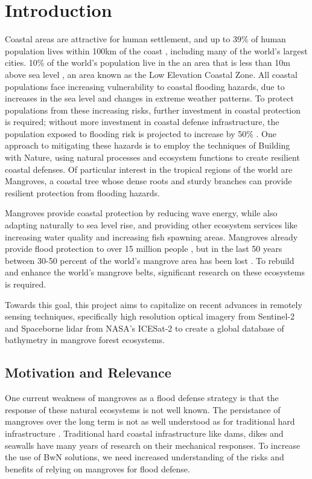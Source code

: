 \chapter{Introduction}

Coastal areas are attractive for human settlement, and up to 39\% of human population lives within 100km of the coast \parencite{Magdalena2021}, including many of the world's largest cities. 10\% of the world's population live in the an area that is less than 10m above sea level \parencite{Neumann2015,Lichter2011}, an area known as the Low Elevation Coastal Zone. All coastal populations face increasing vulnerability to coastal flooding hazards, due to increases in the sea level and changes in extreme weather patterns. To protect populations from these increasing risks, further investment in coastal protection is required; without more investment in coastal defense infrastructure, the population exposed to flooding risk is projected to increase by 50\% \Parencite{Kirezci2020}. One approach to mitigating these hazards is to employ the techniques of Building with Nature, using natural processes and ecosystem functions to create resilient coastal defenses. Of particular interest in the tropical regions of the world are Mangroves, a coastal tree whose dense roots and sturdy branches can provide resilient protection from flooding hazards.

Mangroves provide coastal protection by reducing wave energy, while also adapting naturally to sea level rise, and providing other ecosystem services like increasing water quality and increasing fish spawning areas. Mangroves already provide flood protection to over 15 million people \parencite{Menendez2020}, but in the last 50 years between 30-50 percent of the world's mangrove area has been lost \parencite{Goldberg2020}. To rebuild and enhance the world's mangrove belts, significant research on these ecosystems is required.

Towards this goal, this project aims to capitalize on recent advances in remotely sensing techniques, specifically high resolution optical imagery from Sentinel-2 and Spaceborne lidar from NASA's ICESat-2 to create a global database of bathymetry in mangrove forest ecosystems.

\section{Motivation and Relevance}

One current weakness of mangroves as a flood defense strategy is that the response of these natural ecosystems is not well known. The persistance of mangroves over the long term is not as well understood as for traditional hard infrastructure \parencite{Gijsman2021}. Traditional hard coastal infrastructure like dams, dikes and seawalls have many years of research on their mechanical responses. To increase the use of BwN solutions, we need increased understanding of the risks and benefits of relying on mangroves for flood defense.

